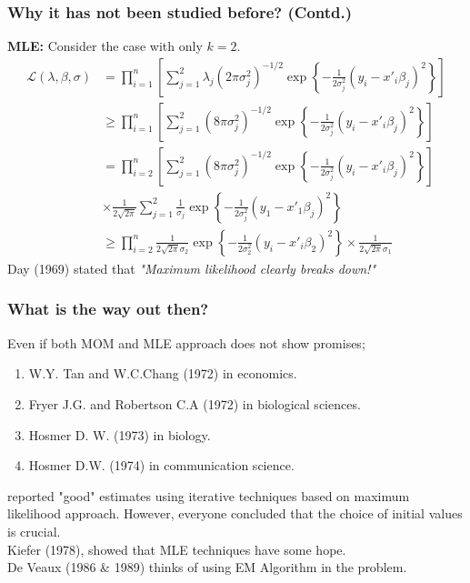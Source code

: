 \documentclass{beamer}
\begin{document}
\begin{frame}
\frametitle{Why it has not been studied before? (Contd.)}
\small 
\textbf{MLE:} Consider the case with only $k=2$. 
\begin{align*}
	\mathcal{L}(\lambda,\beta,\sigma) & = \prod_{i=1}^{n}\left[ \sum_{j=1}^2 \lambda_j (2\pi \sigma_j^2)^{-1/2} \exp\left\{ -\frac{1}{2\sigma_j^2} (y_i - x'_i\beta_j)^2 \right\} \right]\\
	& \geq \prod_{i=1}^{n}\left[ \sum_{j=1}^2 (8\pi \sigma_j^2)^{-1/2} \exp\left\{ -\frac{1}{2\sigma_j^2} (y_i - x'_i\beta_j)^2 \right\} \right]\\
	& = \prod_{i=2}^{n}\left[ \sum_{j=1}^2 (8\pi \sigma_j^2)^{-1/2} \exp\left\{ -\frac{1}{2\sigma_j^2} (y_i - x'_i\beta_j)^2 \right\} \right]\\
	& \times \frac{1}{2\sqrt{2\pi}}\sum_{j=1}^2 \frac{1}{\sigma_j}\exp\left\{ -\frac{1}{2\sigma_j^2} (y_1 - x'_1\beta_j)^2 \right\}\\
	& \geq \prod_{i=2}^{n} \frac{1}{2\sqrt{2\pi}\sigma_2}\exp\left\{ -\frac{1}{2\sigma_2^2} (y_i - x'_i\beta_2)^2 \right\} \times \frac{1}{2\sqrt{2\pi}\sigma_1}
\end{align*}
Day (1969) stated that \textit{"Maximum likelihood clearly breaks down!"}\\
\end{frame}

\begin{frame}
	\frametitle{What is the way out then?}
	Even if both MOM and MLE approach does not show promises;
	\begin{enumerate}
		\item W.Y. Tan and W.C.Chang (1972) in economics.
		\item Fryer J.G. and Robertson C.A (1972) in biological sciences.
		\item Hosmer D. W. (1973) in biology.
		\item Hosmer D.W. (1974) in communication science.
	\end{enumerate}
	reported "good" estimates using iterative techniques based on maximum likelihood approach. However, everyone concluded that the choice of initial values is crucial.\\
	Kiefer (1978), showed that MLE techniques have some hope.\\
	De Veaux (1986 \& 1989) thinks of using EM Algorithm in the problem. 
\end{frame}
\end{document}

